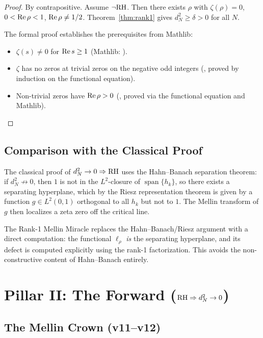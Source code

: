 \documentclass[11pt,a4paper]{article}
\begin{document}
\begin{proof}
By contrapositive. Assume $\neg\mathrm{RH}$. Then there exists $\rho$ with
$\zeta(\rho) = 0$, $0 < \operatorname{Re}\rho < 1$, $\operatorname{Re}\rho \neq 1/2$.
Theorem~\ref{thm:rank1} gives $d_N^2 \geq \delta > 0$ for all $N$.

The formal proof establishes the prerequisites from Mathlib:
\begin{itemize}
  \item $\zeta(s) \neq 0$ for $\operatorname{Re} s \geq 1$ (Mathlib:
    ).
  \item $\zeta$ has no zeros at trivial zeros on the negative odd integers
    (, proved by induction on the
    functional equation).
  \item Non-trivial zeros have $\operatorname{Re}\rho > 0$ (,
    proved via the functional equation and Mathlib).
\end{itemize}
\end{proof}

\subsection{Comparison with the Classical Proof}

The classical proof of $d_N^2 \to 0 \Rightarrow \mathrm{RH}$ uses the
Hahn--Banach separation theorem: if $d_N^2 \not\to 0$, then $1$
is not in the $L^2$-closure of $\operatorname{span}\{h_k\}$, so
there exists a separating hyperplane, which by the Riesz representation
theorem is given by a function $g \in L^2(0,1)$ orthogonal to all $h_k$
but not to $1$. The Mellin transform of $g$ then localizes a zeta zero
off the critical line.

The Rank-1 Mellin Miracle replaces the Hahn--Banach/Riesz argument
with a direct computation: the functional $\ell_\rho$ \emph{is} the
separating hyperplane, and its defect is computed explicitly using
the rank-1 factorization. This avoids the non-constructive content
of Hahn--Banach entirely.

\section{Pillar II: The Forward ($\mathrm{RH} \Rightarrow d_N^2 \to 0$)}
\label{sec:forward}

\subsection{The Mellin Crown (v11--v12)}
\end{document}
